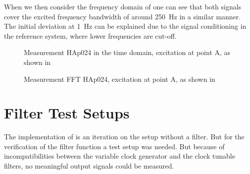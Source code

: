 When we then consider the frequency domain of  one can see that both signals cover the excited frequency bandwidth of around \SI{250}{\hertz} in a similar manner. The initial deviation at \SI{1}{\hertz} can be explained due to the signal conditioning in the reference system, where lower frequencies are cut-off.

\begin{figure}[!htb]
  \centering
  
  \caption[Andromeda Measurement HAp024, Time Domain in Z-Axis]{Measurement HAp024 in the time domain, excitation at point A, as shown in %
    \label{fig:HAp024_TDat_z}}
\end{figure}
\begin{figure}[!htb]
  \centering
  
  \caption[Andromeda Measurement HAp024, FFT in Z-Axis]{Measurement FFT HAp024, excitation at point A, as shown in %
    \label{fig:HAp024_FFTa_z}}
\end{figure}
\clearpage

\section{Filter Test Setups}
The implementation of  is an iteration on the setup without a filter. But for the verification of the filter function a test setup was needed. But because of incompatibilities between the variable clock generator and the clock tunable filters, no meaningful output signals could be measured.

